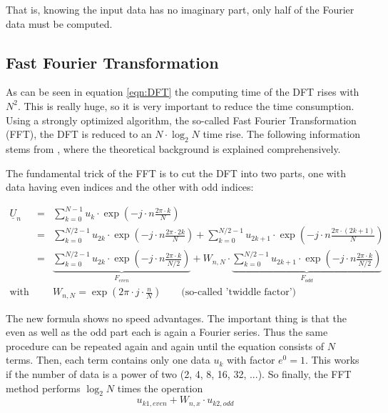 \addvspace{12pt}

That is, knowing the input data has no imaginary part, only half of
the Fourier data must be computed.


\subsection{Fast Fourier Transformation}

As can be seen in equation \ref{eqn:DFT} the computing time of the
DFT rises with $N^2$. This is really huge, so it is
very important to reduce the time consumption. Using a strongly
optimized algorithm, the so-called Fast Fourier Transformation (FFT),
the DFT is reduced to an $N\cdot\log_2 N$ time rise.
The following information stems from \cite{Press},
where the theoretical background is explained comprehensively.

\addvspace{12pt}

The fundamental trick of the FFT is to cut the DFT into two parts,
one with data having even indices and the other with odd indices:

\begin{eqnarray}
\underline{U}_n & = &
  \sum_{k=0}^{N-1} u_k\cdot \exp\left( -j\cdot n\frac{2\pi\cdot k}{N} \right) \\
  & = & \sum_{k=0}^{N/2-1} u_{2k}\cdot
        \exp\left( -j\cdot n\frac{2\pi\cdot 2k}{N} \right) +
        \sum_{k=0}^{N/2-1} u_{2k+1}\cdot
        \exp\left( -j\cdot n\frac{2\pi\cdot (2k+1)}{N} \right) \\
  & = & \underbrace{ \sum_{k=0}^{N/2-1} u_{2k}\cdot
        \exp\left( -j\cdot n\frac{2\pi\cdot k}{N/2} \right) }_{F_{even}} +
        W_{n,N}\cdot \underbrace{ \sum_{k=0}^{N/2-1} u_{2k+1}\cdot
        \exp\left( -j\cdot n\frac{2\pi\cdot k}{N/2} \right) }_{F_{odd}} \\
\text{with} & & W_{n,N} = \exp\left( 2\pi\cdot j\cdot \frac{n}{N} \right)
        \qquad \text{(so-called 'twiddle factor')}
\end{eqnarray}

The new formula shows no speed advantages. The important thing is that
the even as well as the odd part each is again a Fourier series. Thus
the same procedure can be repeated again and again until the equation
consists of $N$ terms. Then, each term contains only one data $u_k$
with factor $e^0=1$. This works if the number of data is a power of
two (2, 4, 8, 16, 32, ...).
So finally, the FFT method performs $\log_2 N$ times the operation
\begin{equation}
\label{eqn:FFTstep}
u_{k1,even} + W_{n,x}\cdot u_{k2,odd}
\end{equation}

